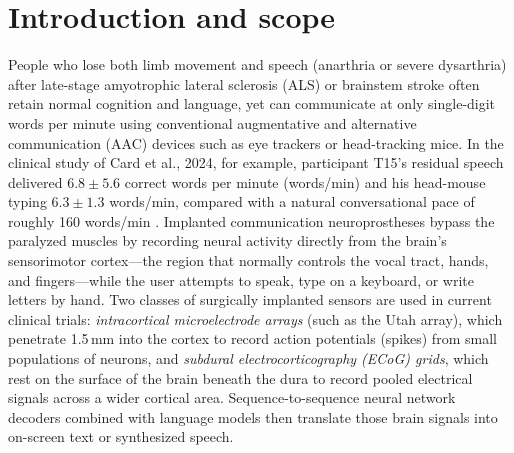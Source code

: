 \documentclass[11pt]{article}
\newcommand{\wpm}{words/min}
\begin{document}
\section{Introduction and scope}
\label{sec:intro}

People who lose both limb movement and speech (anarthria or severe
dysarthria) after late-stage amyotrophic lateral sclerosis (ALS) or
brainstem stroke often retain normal cognition and language, yet can
communicate at only single-digit words per minute using conventional
augmentative and alternative communication (AAC) devices such as eye
trackers or head-tracking mice.
In the clinical study of Card et al., 2024, for example, participant
T15's residual speech delivered $6.8\pm5.6$ correct words per minute
(\wpm{}) and his head-mouse typing $6.3\pm1.3$ \wpm{}, compared with a
natural conversational pace of roughly 160 \wpm{} \cite{card2024}.
Implanted communication neuroprostheses bypass the paralyzed muscles by
recording neural activity directly from the brain's sensorimotor
cortex---the region that normally controls the vocal tract, hands, and
fingers---while the user attempts to speak, type on a keyboard, or write
letters by hand. Two classes of surgically implanted sensors are used in
current clinical trials: \emph{intracortical microelectrode arrays}
(such as the Utah array), which penetrate 1.5\,mm into the cortex to
record action potentials (spikes) from small populations of neurons, and
\emph{subdural electrocorticography (ECoG) grids}, which rest on the
surface of the brain beneath the dura to record pooled electrical
signals across a wider cortical area. Sequence-to-sequence neural
network decoders combined with language models then translate those
brain signals into on-screen text or synthesized speech.
\end{document}
